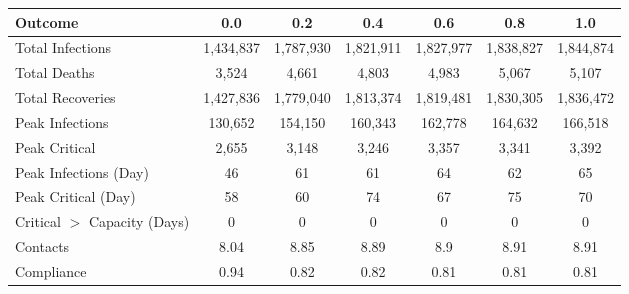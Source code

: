 \begin{table}[ht]
\centering
\begin{tabular}{lcccccc}
  \hline
Outcome & 0.0 & 0.2 & 0.4 & 0.6 & 0.8 & 1.0 \\ 
  \hline
Total Infections & 1,434,837 & 1,787,930 & 1,821,911 & 1,827,977 & 1,838,827 & 1,844,874 \\ 
  Total Deaths &     3,524 &     4,661 &     4,803 &     4,983 &     5,067 &     5,107 \\ 
  Total Recoveries & 1,427,836 & 1,779,040 & 1,813,374 & 1,819,481 & 1,830,305 & 1,836,472 \\ 
  Peak Infections &   130,652 &   154,150 &   160,343 &   162,778 &   164,632 &   166,518 \\ 
  Peak Critical &     2,655 &     3,148 &     3,246 &     3,357 &     3,341 &     3,392 \\ 
  Peak Infections (Day) &        46 &        61 &        61 &        64 &        62 &        65 \\ 
  Peak Critical (Day) &        58 &        60 &        74 &        67 &        75 &        70 \\ 
  Critical $>$ Capacity (Days) &         0 &         0 &         0 &         0 &         0 &         0 \\ 
  Contacts &      8.04 &      8.85 &      8.89 &       8.9 &      8.91 &      8.91 \\ 
  Compliance &      0.94 &      0.82 &      0.82 &      0.81 &      0.81 &      0.81 \\ 
   \hline
\end{tabular}
\end{table}
